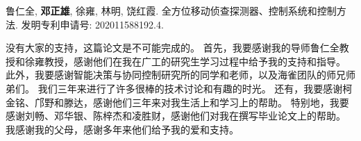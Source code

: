 \documentclass[
  type=master
]{gdutthesis}
\begin{document}
\nocite{*}%
\printbibliography



\begin{results}
  \item 鲁仁全, \textbf{邓正雄}, 徐雍, 林明, 饶红霞. 全方位移动侦查探测器、控制系统和控制方法. 发明专利申请号: 202011588192.4.
\end{results}

\gdutstatement

没有大家的支持，这篇论文是不可能完成的。
首先，我要感谢我的导师鲁仁全教授和徐雍教授，感谢他们在我在广工的研究生学习过程中给予我的支持和指导。
此外，我要感谢智能决策与协同控制研究所的同学和老师，以及海雀团队的师兄师弟们。
我们三年来进行了许多很棒的技术讨论和有趣的时光。
还有，我要感谢柯金铭、邝野和滕达，感谢他们三年来对我生活上和学习上的帮助。
特别地，我要感谢刘畅、邓华银、陈梓杰和凌胜财，感谢他们对我在撰写毕业论文上的帮助。
我感谢我的父母，感谢多年来他们给予我的爱和支持。

%
\end{document}
